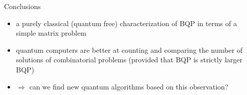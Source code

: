 \documentclass[slideColor]{prosper}
\renewcommand{\>}{\rangle}
\newcommand{\<}{\langle}
\begin{document}
\begin{slide}{Conclusions}
\begin{itemize}
\item a purely classical (quantum free) characterization of BQP in terms of a simple matrix problem

\medskip
\item quantum computers are better at counting and comparing the number of solutions of combinatorial problems (provided that BQP is strictly larger BQP)

\medskip
\item $\Rightarrow$ can we find new quantum algorithms based on this observation?
\end{itemize}
\end{slide}

\end{document}
